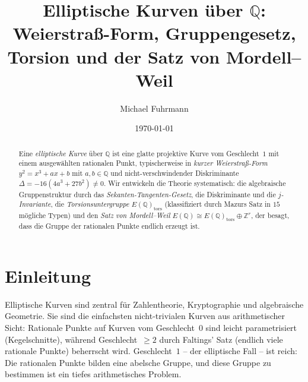 \documentclass[12pt,a4paper]{amsart}
\theoremstyle{definition}
\newcommand{\Z}{\mathbb{Z}}
\newcommand{\Q}{\mathbb{Q}}
\begin{document}

\title{Elliptische Kurven \"uber \texorpdfstring{$\Q$}{Q}:\\
       Weierstra\ss-Form, Gruppengesetz, Torsion und der Satz von Mordell--Weil}

\author{Michael Fuhrmann}
\address{Specialist Mathematics Project, Build 84}
\date{\today}

\begin{abstract}
Eine \emph{elliptische Kurve} \"uber $\Q$ ist eine glatte projektive Kurve
vom Geschlecht~$1$ mit einem ausgew\"ahlten rationalen Punkt, typischerweise
in \emph{kurzer Weierstra\ss-Form} $y^2 = x^3 + ax + b$ mit $a, b \in \Q$
und nicht-verschwindender Diskriminante $\Delta = -16(4a^3 + 27b^2) \ne 0$.
Wir entwickeln die Theorie systematisch:
die algebraische Gruppenstruktur durch das \emph{Sekanten-Tangenten-Gesetz},
die Diskriminante und die \emph{$j$-Invariante},
die \emph{Torsionsuntergruppe} $E(\Q)_{\mathrm{tors}}$ (klassifiziert durch
Mazurs Satz in $15$ m\"ogliche Typen)
und den \emph{Satz von Mordell--Weil}
$E(\Q) \cong E(\Q)_{\mathrm{tors}} \oplus \Z^r$,
der besagt, dass die Gruppe der rationalen Punkte endlich erzeugt ist.
\end{abstract}

\maketitle
\tableofcontents

\section{Einleitung}

Elliptische Kurven sind zentral f\"ur Zahlentheorie, Kryptographie und
algebraische Geometrie.
Sie sind die einfachsten nicht-trivialen Kurven aus arithmetischer Sicht:
Rationale Punkte auf Kurven vom Geschlecht~$0$ sind leicht parametrisiert
(Kegelschnitte), w\"ahrend Geschlecht~$\ge 2$ durch Faltings' Satz
(endlich viele rationale Punkte) beherrscht wird.
Geschlecht~$1$ -- der elliptische Fall -- ist reich:
Die rationalen Punkte bilden eine abelsche Gruppe,
und diese Gruppe zu bestimmen ist ein tiefes arithmetisches Problem.

\end{document}
